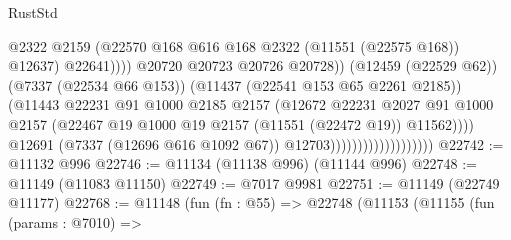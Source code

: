 \begin{lexlean}{RustStd}
\begin{coremodule}
                                                        @2322
                                                        @2159
                                                        (@22570
                                                          @168
                                                          @616
                                                          @168
                                                          @2322
                                                          (@11551 (@22575 @168))
                                                          @12637)
                                                        @22641))))
                                                @20720
                                                @20723
                                                @20726
                                                @20728))
                                            (@12459 (@22529 @62))
                                            (@7337 (@22534 @66 @153))
                                            (@11437 (@22541 @153 @65 @2261 @2185))
                                            (@11443
                                              @22231
                                              @91
                                              @1000
                                              @2185
                                              @2157
                                              (@12672
                                                @22231
                                                @2027
                                                @91
                                                @1000
                                                @2157
                                                (@22467
                                                  @19
                                                  @1000
                                                  @19
                                                  @2157
                                                  (@11551 (@22472 @19))
                                                  @11562))))
                                          @12691
                                          (@7337 (@12696 @616 @1092 @67))
                                          @12703)))))))))))))))))))
@22742 := @11132 @996
@22746 := @11134 (@11138 @996) (@11144 @996)
@22748 := @11149 (@11083 @11150)
@22749 := @7017 @9981
@22751 := @11149 (@22749 @11177)
@22768 := @11148
    (fun (fn : @55) =>
    @22748
      (@11153
        (@11155
          (fun (params : @7010) =>

\end{coremodule}
\end{lexlean}

